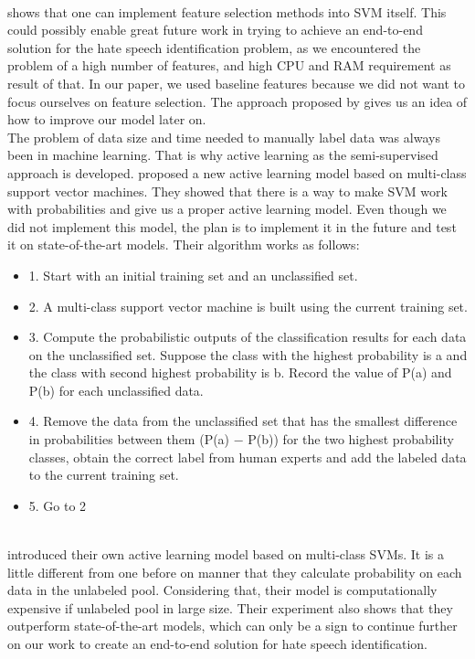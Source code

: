\documentclass[10pt, a4paper]{article}
\begin{document}
	\\\citet{ChenSVMFeatures} shows that one can implement feature selection methods into SVM itself\citep{ChenSVMFeatures}. This could possibly enable great future work in trying to achieve an end-to-end solution for the hate speech identification problem, as we encountered the problem of a high number of features, and high CPU and RAM requirement as result of that. In our paper, we used baseline features because we did not want to focus ourselves on feature selection. The approach proposed by \citet{ChenSVMFeatures} gives us an idea of how to improve our model later on.
	\\The problem of data size and time needed to manually label data was always been in machine learning. That is why active learning as the semi-supervised approach is developed. \citet{LuoALPlankton} proposed a new active learning model based on multi-class support vector machines. They showed that there is a way to make SVM work with probabilities and give us a proper active learning model. Even though we did not implement this model, the plan is to implement it in the future and test it on state-of-the-art models. Their algorithm works as follows\citep{LuoALPlankton}:
	\begin{itemize}
		\item 1. Start with an initial training set and an unclassified set.
		\item 2. A multi-class support vector machine is built using the current training set.
		\item 3. Compute the probabilistic outputs of the classification results for each data on the unclassified set. Suppose the class with the highest probability is a and the class with second highest probability is b. Record the value of P(a) and P(b) for each unclassified data.
		\item 4. Remove the data from the unclassified set that has the smallest difference in probabilities between them (P(a) − P(b)) for the two highest probability classes, obtain the correct label from human experts and add the labeled data to the current training set.
		\item 5. Go to 2
	\end{itemize}
	\\\citet{YangMultiClassAL} introduced their own active learning model based on multi-class SVMs. It is a little different from one before on manner that they calculate probability on each data in the unlabeled pool. Considering that, their model is computationally expensive if unlabeled pool in large size\citep{YangMultiClassAL}. Their experiment also shows that they outperform state-of-the-art models, which can only be a sign to continue further on our work to create an end-to-end solution for hate speech identification.
\end{document}
